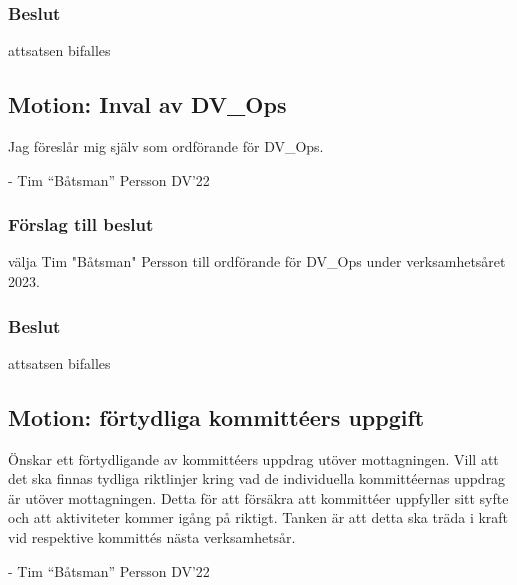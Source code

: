 \documentclass[protokoll]{dvd}
\begin{document}
\subsubsection*{Beslut}
\begin{attsatser}
    \item attsatsen bifalles
\end{attsatser}

\subsection{Motion: Inval av DV\_Ops}
Jag föreslår mig själv som ordförande för DV\_Ops.

- Tim “Båtsman” Persson DV'22

\subsubsection*{Förslag till beslut}
\begin{attsatser}
    \item välja Tim "Båtsman" Persson till ordförande för DV\_Ops under verksamhetsåret 2023.
\end{attsatser}
\subsubsection*{Beslut}
\begin{attsatser}
    \item attsatsen bifalles
\end{attsatser}

\subsection{Motion: förtydliga kommittéers uppgift}
Önskar ett förtydligande av kommittéers uppdrag utöver mottagningen.
Vill att det ska finnas tydliga riktlinjer kring vad de individuella
kommittéernas uppdrag är utöver mottagningen. Detta för att försäkra att kommittéer uppfyller
sitt syfte och att aktiviteter kommer igång på riktigt.
Tanken är att detta ska träda i kraft vid respektive kommittés nästa verksamhetsår.

- Tim “Båtsman” Persson DV'22
\end{document}
